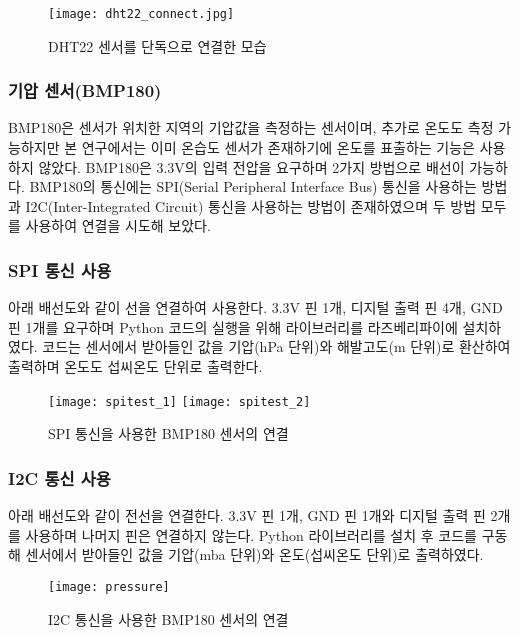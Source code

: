\begin{figure}[htbp]
	\centering
	\texttt{[image: dht22\_connect.jpg]}
	\caption{DHT22 센서를 단독으로 연결한 모습}
	\label{DHT22}
\end{figure}

\subsubsection{기압 센서(BMP180)}
BMP180은 센서가 위치한 지역의 기압값을 측정하는 센서이며, 추가로 온도도 측정 가능하지만 본 연구에서는 이미 온습도 센서가 존재하기에 온도를 표출하는 기능은 사용하지 않았다. BMP180은 3.3V의 입력 전압을 요구하며 2가지 방법으로 배선이 가능하다. BMP180의 통신에는 SPI(Serial Peripheral Interface Bus) 통신을 사용하는 방법과 I2C(Inter-Integrated Circuit) 통신을 사용하는 방법이 존재하였으며 두 방법 모두를 사용하여 연결을 시도해 보았다.\cite{Ref3}
\subsubsection*{SPI 통신 사용}
아래 배선도와 같이 선을 연결하여 사용한다. 3.3V 핀 1개, 디지털 출력 핀 4개, GND 핀 1개를 요구하며 Python 코드의 실행을 위해 라이브러리를 라즈베리파이에 설치하였다. 코드는 센서에서 받아들인 값을 기압(hPa 단위)와 해발고도(m 단위)로 환산하여 출력하며 온도도 섭씨온도 단위로 출력한다.

\begin{figure}[htbp]
	\centering
	\texttt{[image: spitest\_1]}
	\texttt{[image: spitest\_2]}
	\caption{SPI 통신을 사용한 BMP180 센서의 연결}
	\label{SPI}
\end{figure}

\subsubsection*{I2C 통신 사용}
아래 배선도와 같이 전선을 연결한다. 3.3V 핀 1개, GND 핀 1개와 디지털 출력 핀 2개를 사용하며 나머지 핀은 연결하지 않는다. Python 라이브러리를 설치 후 코드를 구동해 센서에서 받아들인 값을 기압(mba 단위)와 온도(섭씨온도 단위)로 출력하였다.

\begin{figure}[htbp]
	\centering
	\texttt{[image: pressure]}
	\caption{I2C 통신을 사용한 BMP180 센서의 연결}
	\label{I2C}
\end{figure}


